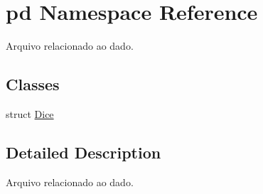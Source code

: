 \hypertarget{namespacepd}{}\section{pd Namespace Reference}
\label{namespacepd}


Arquivo relacionado ao dado.  


\subsection*{Classes}
\begin{DoxyCompactItemize}
\item 
struct \hyperlink{structpd_1_1Dice}{Dice}
\end{DoxyCompactItemize}


\subsection{Detailed Description}
Arquivo relacionado ao dado. 